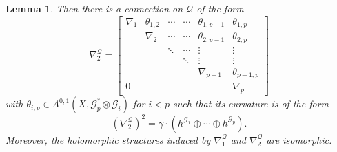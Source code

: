 \documentclass[english,reqno]{amsart}
\newcommand\sG{{\mathscr G}}
\newcommand\sQ{{\mathscr Q}}
\theoremstyle{plain}
\newtheorem{lemma}[thm]{Lemma}
\theoremstyle{definition}
\numberwithin{equation}{section} %
\begin{document}
\begin{lemma}
    Then  there is a connection on $\sQ$ of the form
    \[
    \nabla^{\sQ}_2 =
    \begin{bmatrix}
    \nabla_1 & \theta_{1,2} & \cdots & \cdots & \theta_{1,p-1} & \theta_{1,p} \\
    & \nabla_2  & \cdots & \cdots& \theta_{2,p-1} & \theta_{2,p} \\
    & &\ddots & \cdots & \vdots & \vdots \\
    & & & \ddots & \vdots & \vdots \\
    & & & & \nabla_{p-1} & \theta_{p-1,p} \\
    0 & & & & & \nabla_p
    \end{bmatrix}
    \]
    with $\theta_{i,p}\in A^{0,1}(X, \sG_p^*\otimes \sG_i)$ for $i<p$ such that its curvature is of the form
    $$
    (\nabla^{\sQ}_2)^2   = \gamma \cdot (h^{\sG_1}\oplus\cdots\oplus h^{\sG_p}).
$$
    Moreover, the holomorphic structures induced by $\nabla^\sQ_1$ and $\nabla^\sQ_2$ are isomorphic.
\end{lemma}
\end{document}

